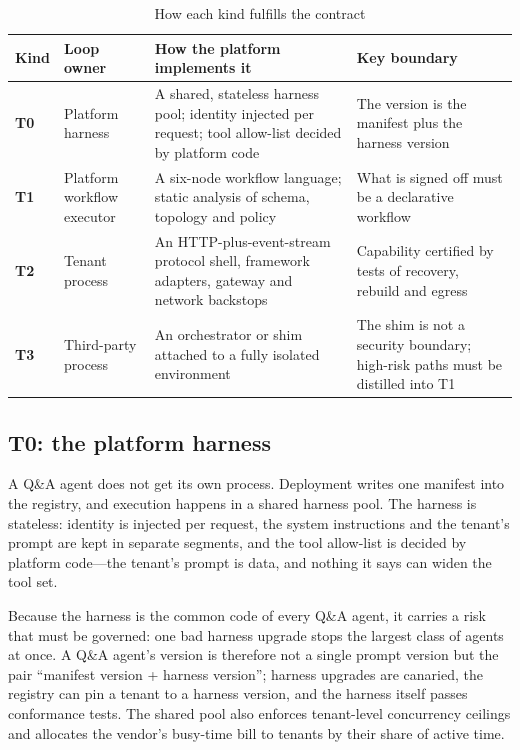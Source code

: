 \begin{table}[htbp]
\centering
\caption{How each kind fulfills the contract}
\label{tab:fulfill}
\begin{tabularx}{\textwidth}{@{}>{\bfseries}L{1.0cm}L{2.8cm}L{5.0cm}Y@{}}
  \toprule
  \textbf{Kind} & \textbf{Loop owner} & \textbf{How the platform implements it} & \textbf{Key boundary}\\
  \midrule
  T0 & Platform harness & A shared, stateless harness pool; identity injected per request; tool allow-list decided by platform code & The version is the manifest plus the harness version\\
  T1 & Platform workflow executor & A six-node workflow language; static analysis of schema, topology and policy & What is signed off must be a declarative workflow\\
  T2 & Tenant process & An HTTP-plus-event-stream protocol shell, framework adapters, gateway and network backstops & Capability certified by tests of recovery, rebuild and egress\\
  T3 & Third-party process & An orchestrator or shim attached to a fully isolated environment & The shim is not a security boundary; high-risk paths must be distilled into T1\\
  \bottomrule
\end{tabularx}
\end{table}

\subsection{T0: the platform harness}

A Q\&A agent does not get its own process. Deployment writes one manifest into the registry, and execution happens in a shared harness pool. The harness is stateless: identity is injected per request, the system instructions and the tenant's prompt are kept in separate segments, and the tool allow-list is decided by platform code---the tenant's prompt is data, and nothing it says can widen the tool set.

Because the harness is the common code of every Q\&A agent, it carries a risk that must be governed: one bad harness upgrade stops the largest class of agents at once. A Q\&A agent's version is therefore not a single prompt version but the pair ``manifest version + harness version''; harness upgrades are canaried, the registry can pin a tenant to a harness version, and the harness itself passes conformance tests. The shared pool also enforces tenant-level concurrency ceilings and allocates the vendor's busy-time bill to tenants by their share of active time.

